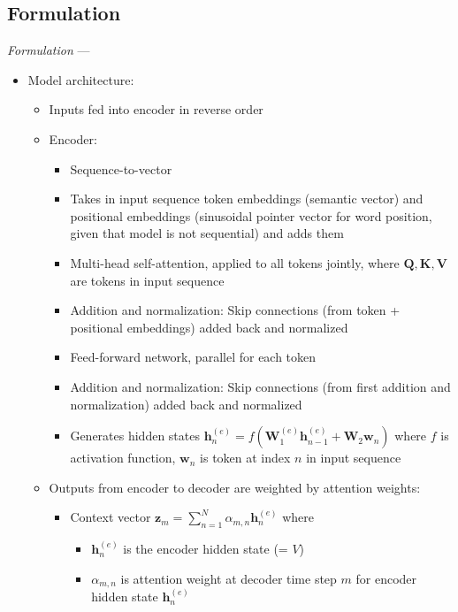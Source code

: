 \subsection*{Formulation}
\emph{Formulation} --- 
\begin{itemize}
    \item Model architecture: 
    \begin{itemize}
        \item Inputs fed into encoder in reverse order
        \item Encoder: 
        \begin{itemize}
            \item Sequence-to-vector
            \item Takes in input sequence token embeddings (semantic vector) and positional embeddings (sinusoidal pointer vector for word position, given that model is not sequential) and adds them
            \item Multi-head self-attention, applied to all tokens jointly, where $\boldsymbol{Q,K,V}$ are tokens in input sequence
            \item Addition and normalization: Skip connections (from token + positional embeddings) added back and normalized
            \item Feed-forward network, parallel for each token
            \item Addition and normalization: Skip connections (from first addition and normalization) added back and normalized
            \item Generates hidden states $\boldsymbol{h}_n^{(e)} = f ( \boldsymbol{W}_1^{(e)} \boldsymbol{h}_{n-1}^{(e)} + \boldsymbol{W}_2 \boldsymbol{w}_n )$ where $f$ is activation function, $\boldsymbol{w}_n$ is token at index $n$ in input sequence
        \end{itemize}
        \item Outputs from encoder to decoder are weighted by attention weights:
        \begin{itemize}
            \item Context vector $\boldsymbol{z}_m = \sum_{n=1}^N \alpha_{m,n} \boldsymbol{h}_n^{(e)}$ where 
            \begin{itemize}
                \item $\boldsymbol{h}_n^{(e)}$ is the encoder hidden state (= $V$)
                \item $\alpha_{m,n}$ is attention weight at decoder time step $m$ for encoder hidden state $\boldsymbol{h}_n^{(e)}$

\end{itemize}
\end{itemize}
\end{itemize}
\end{itemize}
